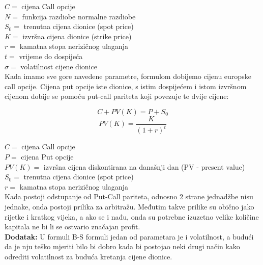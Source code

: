 \documentclass[times, utf8, seminar]{fer}
\begin{document}
\noindent $C =$ cijena Call opcije \\
$N =$ funkcija razdiobe normalne razdiobe\\
$S_0 =$ trenutna cijena dionice (spot price)\\
$K =$ izvršna cijena dionice (strike price)\\
$r =$ kamatna stopa nerizičnog ulaganja\\
$t =$ vrijeme do dospijeća\\
$\sigma =$ volatilnost cijene dionice \\

\noindent Kada imamo sve gore navedene parametre, formulom dobijemo cijenu europske call opcije. Cijena put opcije iste dionice, s istim dospijećem i istom izvršnom cijenom dobije se pomoću put-call pariteta koji povezuje te dvije cijene:

    \[ C + PV(K) = P + S_0 \]
    \[ PV(K) = \frac{K}{(1+r)^t} \]

\noindent $C =$ cijena Call opcije \\
$P =$ cijena Put opcije \\
$PV(K) =$ izvršna cijena diskontirana na današnji dan (PV - present value)\\
$S_0 =$ trenutna cijena dionice (spot price)\\
$r =$ kamatna stopa nerizičnog ulaganja \\

Kada postoji odstupanje od Put-Call pariteta, odnosno 2 strane jednadžbe nisu jednake, onda postoji prilika za arbitražu. Međutim takve prilike su obično jako rijetke i kratkog vijeka, a ako se i nađu, onda su potrebne izuzetno velike količine kapitala ne bi li se ostvario značajan profit.\\

\noindent\textbf{Dodatak:}
U formuli B-S formuli jedan od parametara je i volatilnost, a budući da je nju teško mjeriti bilo bi dobro kada bi postojao neki drugi način kako odrediti volatilnost za buduća kretanja cijene dionice.\\
\end{document}

